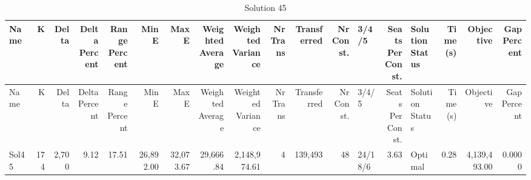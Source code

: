\documentclass[a4paper]{article}
\begin{document}
{\scriptsize
\begin{longtable}{lrrrrrrrrrrrlrlrrr}
\caption{Solution 45}
\\ \toprule
Name &K &Delta &\shortstack{Delta\\Percent} &\shortstack{Range\\Percent} &Min E &Max E &\shortstack{Weighted\\Average} &\shortstack{Weighted\\Variance} &\shortstack{Nr\\Trans} &Transferred &\shortstack{Nr\\Const.} &3/4/5 &\shortstack{Seats\\Per\\Const.} &\shortstack{Solution\\Status} &\shortstack{Time\\(s)} &Objective &\shortstack{Gap\\Percent} \\ \midrule
\endfirsthead
\toprule
Name &K &Delta &\shortstack{Delta\\Percent} &\shortstack{Range\\Percent} &Min E &Max E &\shortstack{Weighted\\Average} &\shortstack{Weighted\\Variance} &\shortstack{Nr\\Trans} &Transferred &\shortstack{Nr\\Const.} &3/4/5 &\shortstack{Seats\\Per\\Const.} &\shortstack{Solution\\Status} &\shortstack{Time\\(s)} &Objective &\shortstack{Gap\\Percent} \\ \midrule
\endhead
\bottomrule
\endfoot
Sol45&174&2,700& 9.12&17.51&26,892.00&32,073.67&29,666.84&2,148,974.61&4&139,493&48&24/18/6& 3.63&Optimal& 0.28&4,139,493.00&0.0000\\ 
\end{longtable}

}
\end{document}
